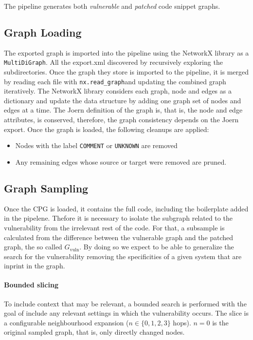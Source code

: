 \documentclass[11pt, a4paper]{article}
\begin{document}
The pipeline generates both \textit{vulnerable} and \textit{patched} code snippet graphs.  

\subsection*{Graph Loading}
The exported graph is imported into the pipeline using the NetworkX library as a \verb|MultiDiGraph|. %
All the export.xml discovered by recursively exploring the subdirectories. Once the graph they store is imported to the pipeline, it is merged by reading each file with \verb|nx.read_graph|and updating the combined graph iteratively. 
The NetworkX library considers each graph, node and edges as a dictionary and update the data structure by adding one graph set of nodes and edges at a time.
The Joern definition of the graph is, that is, the node and edge attributes, is conserved, therefore, the graph consistency depends on the Joern export. 
Once the graph is loaded, the following cleanups are applied:
\begin{itemize}
  \item Nodes with the label \verb|COMMENT| or \verb|UNKNOWN| are removed
  \item Any remaining edges whose source or target were removed are pruned.
\end{itemize}

\subsection*{Graph Sampling}
Once the CPG is loaded, it contains the full code, including the boilerplate added in the pipelene.
Thefore it is necessary to isolate the subgraph related to the vulnerability from the irrelevant rest of the code. 
For that, a subsample is calculated from the difference between the vulnerable graph and the patched graph, the so called $G_{\mathrm{vuln}}$. 
By doing so we expect to be able to generalize the search for the vulnerability removing the specificities of a given system that are inprint in the graph.

\paragraph{Bounded slicing}
To include context that may be relevant, a bounded search is performed with the goal of include any relevant settings in which the vulnerability occurs.
The slice is a configurable neighbourhood expansion ($n \in \{0,1,2,3\}$ hops). $n=0$ is the original sampled graph, that is, only directly changed nodes.
    
\end{document}

